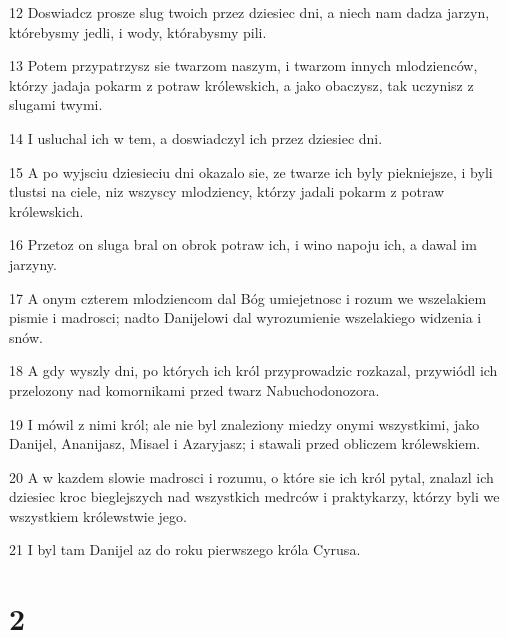 \par 12 Doswiadcz prosze slug twoich przez dziesiec dni, a niech nam dadza jarzyn, którebysmy jedli, i wody, którabysmy pili.
\par 13 Potem przypatrzysz sie twarzom naszym, i twarzom innych mlodzienców, którzy jadaja pokarm z potraw królewskich, a jako obaczysz, tak uczynisz z slugami twymi.
\par 14 I usluchal ich w tem, a doswiadczyl ich przez dziesiec dni.
\par 15 A po wyjsciu dziesieciu dni okazalo sie, ze twarze ich byly piekniejsze, i byli tlustsi na ciele, niz wszyscy mlodziency, którzy jadali pokarm z potraw królewskich.
\par 16 Przetoz on sluga bral on obrok potraw ich, i wino napoju ich, a dawal im jarzyny.
\par 17 A onym czterem mlodziencom dal Bóg umiejetnosc i rozum we wszelakiem pismie i madrosci; nadto Danijelowi dal wyrozumienie wszelakiego widzenia i snów.
\par 18 A gdy wyszly dni, po których ich król przyprowadzic rozkazal, przywiódl ich przelozony nad komornikami przed twarz Nabuchodonozora.
\par 19 I mówil z nimi król; ale nie byl znaleziony miedzy onymi wszystkimi, jako Danijel, Ananijasz, Misael i Azaryjasz; i stawali przed obliczem królewskiem.
\par 20 A w kazdem slowie madrosci i rozumu, o które sie ich król pytal, znalazl ich dziesiec kroc bieglejszych nad wszystkich medrców i praktykarzy, którzy byli we wszystkiem królewstwie jego.
\par 21 I byl tam Danijel az do roku pierwszego króla Cyrusa.

\chapter{2}

